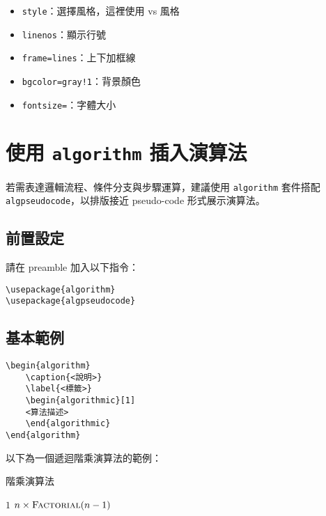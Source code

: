 \begin{itemize} 
\item \texttt{style}：選擇風格，這裡使用 vs 風格
\item \texttt{linenos}：顯示行號
\item \texttt{frame=lines}：上下加框線
\item \texttt{bgcolor=gray!1}：背景顏色
\item \texttt{fontsize=\small}：字體大小
\end{itemize}
\section{使用 \texttt{algorithm} 插入演算法}

若需表達邏輯流程、條件分支與步驟運算，建議使用 \texttt{algorithm} 套件搭配 \texttt{algpseudocode}，以排版接近 pseudo-code 形式展示演算法。

\subsection*{前置設定}

請在 preamble 加入以下指令：

\begin{verbatim}
\usepackage{algorithm}
\usepackage{algpseudocode}
\end{verbatim}

\subsection*{基本範例}

\begin{verbatim}
\begin{algorithm}
    \caption{<說明>}
    \label{<標籤>}
    \begin{algorithmic}[1]
    <算法描述>
    \end{algorithmic}
\end{algorithm}
\end{verbatim}

以下為一個遞迴階乘演算法的範例：

\begin{algorithm}
\caption{階乘演算法}
\label{alg:factorial}
\begin{algorithmic}[1]
            \State \Return $1$
        \Else
            \State \Return $n \times \Call{Factorial}{n - 1}$
        \EndIf
    \EndFunction
\end{algorithmic}
\end{algorithm}


